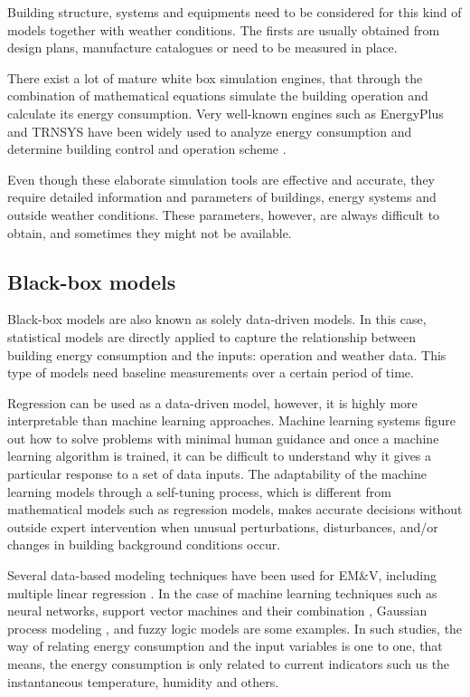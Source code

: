 \documentclass[10pt, conference, compsocconf]{IEEEtran}
\begin{document}
Building structure, systems and equipments need to be considered for this kind of models together with weather conditions. The firsts are usually obtained from design plans, manufacture catalogues or need to be measured in place.

There exist a lot of mature white box simulation engines, that through the combination of mathematical equations simulate the building operation and calculate its energy consumption. Very well-known engines such as EnergyPlus \cite{crawley2001energyplus} and TRNSYS \cite{TRNSYS} have been widely used to analyze energy consumption and determine building control and operation scheme \cite{crawley2008contrasting}.

Even though these elaborate simulation tools are effective and accurate, they require detailed information and parameters of buildings, energy systems and outside weather conditions. These parameters, however, are always difficult to obtain, and sometimes they might not be available.

\subsection{Black-box models}


Black-box models are also known as solely data-driven models. In this case, statistical models are directly applied to capture the relationship between building energy consumption and the inputs: operation and weather data. This type of models need baseline measurements over a certain period of time.

Regression can be used as a data-driven model, however, it is highly more interpretable than machine learning approaches. 
Machine learning systems figure out how to solve problems with minimal human guidance and once a machine learning algorithm is trained, it can be difficult to understand why it gives a particular response to a set of data inputs. The adaptability of the machine learning models through a self-tuning process, which is different from mathematical models such as regression models, makes accurate decisions without outside expert intervention when unusual perturbations, disturbances, and/or changes in building background conditions occur.

Several data-based modeling techniques have been used for EM\&V, including multiple linear regression \cite{braun2014using}.  %
In the case of machine learning techniques such as neural networks, support vector machines and their combination \cite{ahmad2014review}, Gaussian process modeling \cite{heo2012gaussian}, and fuzzy logic models \cite{ciabattoni2014fuzzy} are some examples. In such studies, the way of relating energy consumption and the input variables is one to one, that means, the energy consumption is only related to current indicators such us the instantaneous temperature, humidity and others. 
  
\end{document}
